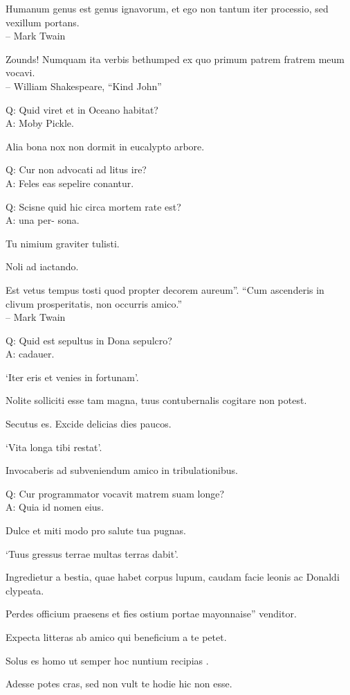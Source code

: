 \documentclass[titlepage,12pt]{memoir}
\begin{document}
Humanum genus est genus ignavorum, et ego non tantum iter
processio, sed vexillum portans.
\\-- Mark Twain

Zounds! Numquam ita verbis bethumped
ex quo primum patrem fratrem meum vocavi.
\\-- William Shakespeare, “Kind John”

Q: Quid viret et in Oceano habitat?\\
A: Moby Pickle.

Alia bona nox non dormit in eucalypto arbore.

Q: Cur non advocati ad litus ire?\\
A: Feles eas sepelire conantur.

Q: Scisne quid hic circa mortem rate est?\\
A: una per- sona.

Tu nimium graviter tulisti.

Noli ad iactando.

Est vetus tempus tosti quod propter decorem aureum”.
“Cum ascenderis in clivum prosperitatis, non occurris amico.”
\\-- Mark Twain

Q: Quid est sepultus in Dona sepulcro?\\
A: cadauer.

‘Iter eris et venies in fortunam’.

Nolite solliciti esse tam magna, tuus contubernalis cogitare non potest.

Secutus es. Excide delicias dies paucos.

‘Vita longa tibi restat’.

Invocaberis ad subveniendum amico in tribulationibus.

Q: Cur programmator vocavit matrem suam longe?\\
A: Quia id nomen eius.

Dulce et miti modo pro salute tua pugnas.

‘Tuus gressus terrae multas terras dabit’.

Ingredietur a bestia, quae habet corpus lupum, caudam
facie leonis ac Donaldi clypeata.

Perdes officium praesens et fies ostium portae mayonnaise”
venditor.

Expecta litteras ab amico qui beneficium a te petet.

 Solus es homo ut semper hoc nuntium recipias .

Adesse potes cras, sed non vult te hodie hic non esse.
\end{document}
